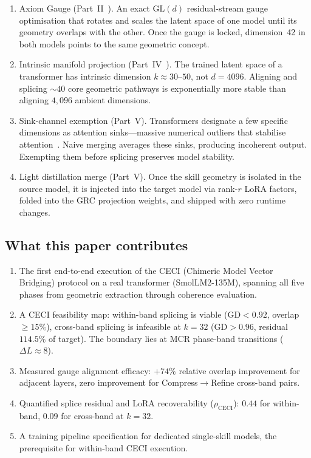 \documentclass[11pt]{article}
\begin{document}
\begin{enumerate}
\item Axiom Gauge (Part~II~\cite{stewart2026gp}).  An exact
      $\mathrm{GL}(d)$ residual-stream gauge optimisation that rotates
      and scales the latent space of one model until its geometry
      overlaps with the other.  Once the gauge is locked, dimension~42
      in both models points to the same geometric concept.

\item Intrinsic manifold projection (Part~IV~\cite{stewart2026ott}).
      The trained latent space of a transformer has intrinsic dimension
      $k{\approx}30$--$50$, not $d{=}4096$.  Aligning and splicing
      ${\sim}40$ core geometric pathways is exponentially more stable
      than aligning $4{,}096$ ambient dimensions.

\item Sink-channel exemption (Part~V).  Transformers designate
      a few specific dimensions as attention sinks---massive numerical
      outliers that stabilise attention~\cite{sun2024massive,
      xiao2023streamingllm}.  Naive merging averages these sinks,
      producing incoherent output.  Exempting them before splicing
      preserves model stability.

\item Light distillation merge (Part~V).  Once the skill
      geometry is isolated in the source model, it is injected into the
      target model via rank-$r$ LoRA factors, folded into the GRC
      projection weights, and shipped with zero runtime changes.
\end{enumerate}

\subsection{What this paper contributes}

\begin{enumerate}
\item The first end-to-end execution of the CECI (Chimeric Model Vector
      Bridging) protocol on a real transformer (SmolLM2-135M), spanning
      all five phases from geometric extraction through coherence
      evaluation.
\item A CECI feasibility map: within-band splicing is viable
      (GD${<}0.92$, overlap ${\ge}15\%$), cross-band splicing is
      infeasible at $k{=}32$ (GD${>}0.96$, residual $114.5\%$ of target).
      The boundary lies at MCR phase-band transitions ($\Delta L{\approx}8$).
\item Measured gauge alignment efficacy: $+74\%$ relative overlap
      improvement for adjacent layers, zero improvement for
      Compress$\to$Refine cross-band pairs.
\item Quantified splice residual and LoRA recoverability ($\rho_{\mathrm{CECI}}$):
      $0.44$ for within-band, $0.09$ for cross-band at $k{=}32$.
\item A training pipeline specification for dedicated single-skill
      models, the prerequisite for within-band CECI execution.
\end{enumerate}
\end{document}
